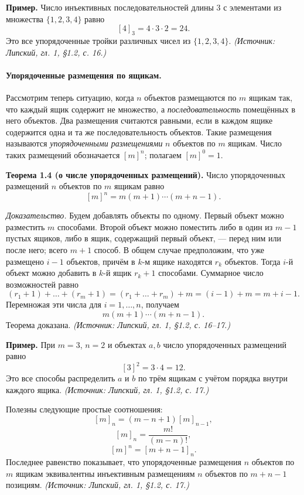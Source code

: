 \documentclass[a4paper,12pt]{article}
\begin{document}
\textbf{Пример.} Число инъективных последовательностей длины \(3\) с элементами из множества \(\{1,2,3,4\}\) равно
\[
[4]_3=4\cdot3\cdot2=24.
\]
Это все упорядоченные тройки различных чисел из \(\{1,2,3,4\}\).
\textit{(Источник: Липский, гл. 1, §1.2, с. 16.)}

\paragraph{Упорядоченные размещения по ящикам.}
Рассмотрим теперь ситуацию, когда \(n\) объектов размещаются по \(m\) ящикам так, что каждый ящик содержит не множество, а \emph{последовательность} помещённых в него объектов. Два размещения считаются равными, если в каждом ящике содержится одна и та же последовательность объектов. Такие размещения называются \emph{упорядоченными размещениями} \(n\) объектов по \(m\) ящикам. Число таких размещений обозначается \([m]^n\); полагаем \([m]^0=1\).

\textbf{Теорема 1.4 (о числе упорядоченных размещений).} Число упорядоченных размещений \(n\) объектов по \(m\) ящикам равно
\[
[m]^n=m(m+1)\cdots(m+n-1).
\]

\emph{Доказательство.} Будем добавлять объекты по одному. Первый объект можно разместить \(m\) способами. Второй объект можно поместить либо в один из \(m-1\) пустых ящиков, либо в ящик, содержащий первый объект, --- перед ним или после него; всего \(m+1\) способ. В общем случае предположим, что уже размещено \(i-1\) объектов, причём в \(k\)-м ящике находятся \(r_k\) объектов. Тогда \(i\)-й объект можно добавить в \(k\)-й ящик \(r_k+1\) способами. Суммарное число возможностей равно
\[
(r_1+1)+\dots+(r_m+1)=(r_1+\dots+r_m)+m=(i-1)+m=m+i-1.
\]
Перемножая эти числа для \(i=1,\dots,n\), получаем
\[
m(m+1)\cdots(m+n-1).
\]
Теорема доказана.
\textit{(Источник: Липский, гл. 1, §1.2, с. 16--17.)}

\textbf{Пример.} При \(m=3\), \(n=2\) и объектах \(a,b\) число упорядоченных размещений равно
\[
[3]^2=3\cdot4=12.
\]
Это все способы распределить \(a\) и \(b\) по трём ящикам с учётом порядка внутри каждого ящика.
\textit{(Источник: Липский, гл. 1, §1.2, с. 17.)}

Полезны следующие простые соотношения:
\[
[m]_n=(m-n+1)[m]_{n-1},
\]
\[
[m]_n=\frac{m!}{(m-n)!},
\]
\[
[m]^n=[m+n-1]_n.
\]
Последнее равенство показывает, что упорядоченные размещения \(n\) объектов по \(m\) ящикам эквивалентны инъективным размещениям \(n\) объектов по \(m+n-1\) позициям.
\textit{(Источник: Липский, гл. 1, §1.2, с. 17.)}
\end{document}

